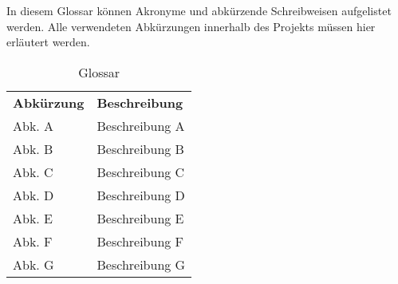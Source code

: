 \begin{tcolorbox}
In diesem Glossar können Akronyme und abkürzende Schreibweisen aufgelistet werden. 
Alle verwendeten Abkürzungen innerhalb des Projekts müssen hier erläutert werden.
\end{tcolorbox}

\begin{table}[h]
	\centering
	\begin{tabularx}{\textwidth}{X X}
		\rowcolor[HTML]{C0C0C0} 
		\textbf{Abkürzung} & \textbf{Beschreibung} \\
		Abk. A & Beschreibung A \\
		\rowcolor[HTML]{E7E7E7} 
		Abk. B & Beschreibung B \\
		Abk. C & Beschreibung C \\
		\rowcolor[HTML]{E7E7E7} 
		Abk. D & Beschreibung D \\
		Abk. E & Beschreibung E \\
		\rowcolor[HTML]{E7E7E7} 
		Abk. F & Beschreibung F \\
		Abk. G & Beschreibung G
	\end{tabularx}
	\caption{Glossar}
	\label{table:glossar}
\end{table}